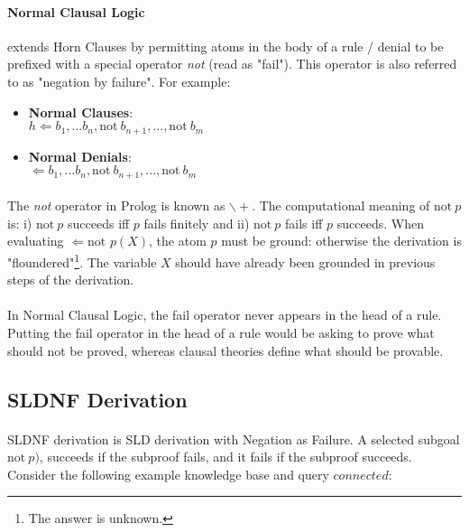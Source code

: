 \documentclass{article}
\theoremstyle{plain}
\theoremstyle{definition}
\begin{document}
\begin{multicols}{2}
\paragraph{Normal Clausal Logic} extends Horn Clauses by permitting atoms in the body of a rule / denial to be prefixed with a special operator \textit{not} (read as "fail"). This operator is also referred to as "negation by failure". For example:

\begin{itemize}
\setlength\itemsep{0.1em}
\item[] \textbf{Normal Clauses}:\\ $h \Leftarrow b_1, ... b_n, \text{not}\ b_{n+1}, ..., \text{not}\ b_m$
\item[] \textbf{Normal Denials}:\\ $\Leftarrow b_1, ... b_n, \text{not}\ b_{n+1}, ..., \text{not}\ b_m$
\end{itemize}

\paragraph{} The \textit{not} operator in Prolog is known as $\backslash+$. The computational meaning of $\text{not}\ p$ is: i) $\text{not}\ p$ succeeds iff $p$ fails finitely and ii) $\text{not}\ p$ fails iff $p$ succeeds. When evaluating $\Leftarrow \text{not } p(X)$, the atom $p$ must be ground: otherwise the derivation is "floundered"\footnote{The answer is unknown.}. The variable $X$ should have already been grounded in previous steps of the derivation.

\paragraph{} In Normal Clausal Logic, the fail operator never appears in the head of a rule. Putting the fail operator in the head of a rule would be asking to prove what should not be proved, whereas clausal theories define what should be provable.

\subsection{SLDNF Derivation}
\paragraph{} SLDNF derivation is SLD derivation with Negation as Failure. A selected subgoal $\text{not}\ p)$,  succeeds if the subproof fails, and it fails if the subproof succeeds. Consider the following example knowledge base and query $connected$:


\end{multicols}
\end{document}
